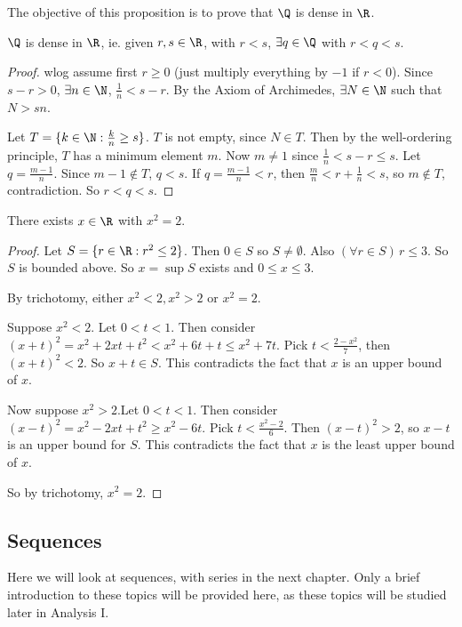\documentclass[a4paper]{article}
\begin{document}
The objective of this proposition is to prove that $\Q$ is dense in $\R$.
\begin{thm}
  $\Q$ is dense in $\R$, ie. given $r, s\in \R$, with $r < s$, $\exists q\in \Q$ with $r < q < s$.
\end{thm}

\begin{proof}
  wlog assume first $r \geq 0$ (just multiply everything by $-1$ if $r < 0$). Since $s - r > 0$, $\exists n\in \N$, $\frac{1}{n} < s - r$. By the Axiom of Archimedes, $\exists N\in \N$ such that $N > sn$.

  Let $T = \{k\in \N: \frac{k}{n}\geq s\}$. $T$ is not empty, since $N\in T$. Then by the well-ordering principle, $T$ has a minimum element $m$. Now $m\not= 1$ since $\frac{1}{n} < s - r \leq s$. Let $q = \frac{m - 1}{n}$. Since $m - 1\not\in T$, $q < s$. If $q =\frac{m - 1}{n}< r$, then $\frac{m}{n} < r + \frac{1}{n} < s$, so $m\not\in T$, contradiction. So $r < q < s$.
\end{proof}

\begin{thm}
  There exists $x\in \R$ with $x^2 = 2$.
\end{thm}

\begin{proof}
  Let $S = \{r\in \R: r^2 \leq 2\}$. Then $0\in S$ so $S\not= \emptyset$. Also $(\forall r\in S)\,r \leq 3$. So $S$ is bounded above. So $x = \sup S$ exists and $0\leq x \leq 3$.

  By trichotomy, either $x^2 < 2, x^2 > 2$ or $x^2 = 2$.

  Suppose $x^2 < 2$. Let $0 < t < 1$. Then consider $(x + t)^2 = x^2 + 2xt + t^2 < x^2 + 6t + t \leq x^2 + 7t$. Pick $t < \frac{2 - x^2}{7}$, then $(x + t)^2 < 2$. So $x + t \in S$. This contradicts the fact that $x$ is an upper bound of $x$.

  Now suppose $x^2 > 2$.Let $0 < t < 1$. Then consider $(x - t)^2 = x^2 - 2xt + t^2 \geq x^2 - 6t$. Pick $t < \frac{x^2 - 2}{6}$. Then $(x - t)^2 > 2$, so $x - t$ is an upper bound for $S$. This contradicts the fact that $x$ is the least upper bound of $x$.

  So by trichotomy, $x^2 = 2$.
\end{proof}

\subsection{Sequences}
Here we will look at sequences, with series in the next chapter. Only a brief introduction to these topics will be provided here, as these topics will be studied later in Analysis I.
\end{document}
